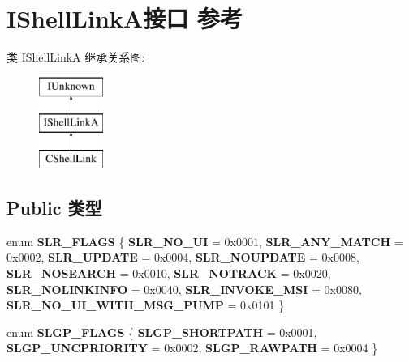 \hypertarget{interface_i_shell_link_a}{}\section{I\+Shell\+Link\+A接口 参考}
\label{interface_i_shell_link_a}
类 I\+Shell\+LinkA 继承关系图\+:\begin{figure}[H]
\begin{center}
\leavevmode
\includegraphics[height=3.000000cm]{interface_i_shell_link_a}
\end{center}
\end{figure}
\subsection*{Public 类型}
\begin{DoxyCompactItemize}
\item 
\mbox{\label{interface_i_shell_link_a_a2198d8d4e75e3f24085311e20924ec1e}} 
enum {\bfseries S\+L\+R\+\_\+\+F\+L\+A\+GS} \{ \newline
{\bfseries S\+L\+R\+\_\+\+N\+O\+\_\+\+UI} = 0x0001, 
{\bfseries S\+L\+R\+\_\+\+A\+N\+Y\+\_\+\+M\+A\+T\+CH} = 0x0002, 
{\bfseries S\+L\+R\+\_\+\+U\+P\+D\+A\+TE} = 0x0004, 
{\bfseries S\+L\+R\+\_\+\+N\+O\+U\+P\+D\+A\+TE} = 0x0008, 
\newline
{\bfseries S\+L\+R\+\_\+\+N\+O\+S\+E\+A\+R\+CH} = 0x0010, 
{\bfseries S\+L\+R\+\_\+\+N\+O\+T\+R\+A\+CK} = 0x0020, 
{\bfseries S\+L\+R\+\_\+\+N\+O\+L\+I\+N\+K\+I\+N\+FO} = 0x0040, 
{\bfseries S\+L\+R\+\_\+\+I\+N\+V\+O\+K\+E\+\_\+\+M\+SI} = 0x0080, 
\newline
{\bfseries S\+L\+R\+\_\+\+N\+O\+\_\+\+U\+I\+\_\+\+W\+I\+T\+H\+\_\+\+M\+S\+G\+\_\+\+P\+U\+MP} = 0x0101
 \}
\item 
\mbox{\label{interface_i_shell_link_a_af88b37acb794ce0d21db34bf2eac05e1}} 
enum {\bfseries S\+L\+G\+P\+\_\+\+F\+L\+A\+GS} \{ {\bfseries S\+L\+G\+P\+\_\+\+S\+H\+O\+R\+T\+P\+A\+TH} = 0x0001, 
{\bfseries S\+L\+G\+P\+\_\+\+U\+N\+C\+P\+R\+I\+O\+R\+I\+TY} = 0x0002, 
{\bfseries S\+L\+G\+P\+\_\+\+R\+A\+W\+P\+A\+TH} = 0x0004
 \}
\end{DoxyCompactItemize}
